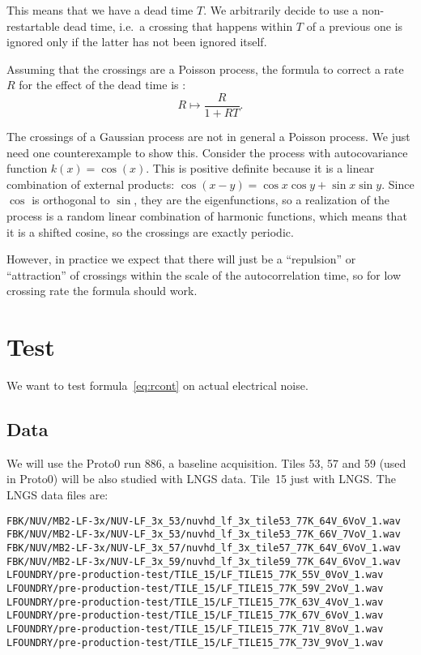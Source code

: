This means that we have a dead time $T$. We arbitrarily decide to use a
non-restartable dead time, i.e.\ a crossing that happens within $T$ of a
previous one is ignored only if the latter has not been ignored itself.

Assuming that the crossings are a Poisson process, the formula to correct a
rate $R$ for the effect of the dead time is \cite[120]{knoll2010}:
%
\begin{equation}
    R \mapsto \frac R {1 + RT}. \label{eq:deadrate}
\end{equation}

The crossings of a Gaussian process are not in general a Poisson process. We
just need one counterexample to show this. Consider the process with
autocovariance function $k(x)=\cos(x)$. This is positive definite because it is
a linear combination of external products: $\cos(x-y) = \cos x \cos y + \sin x
\sin y$. Since $\cos$ is orthogonal to $\sin$, they are the eigenfunctions, so
a realization of the process is a random linear combination of harmonic
functions, which means that it is a shifted cosine, so the crossings are
exactly periodic.

However, in practice we expect that there will just be a ``repulsion'' or
``attraction'' of crossings within the scale of the autocorrelation time, so
for low crossing rate the formula should work.

\section{Test}

We want to test formula~\eqref{eq:rcont} on actual electrical noise.

\subsection{Data}

We will use the Proto0 run 886, a baseline acquisition. Tiles 53, 57 and 59
(used in Proto0) will be also studied with LNGS data. Tile~15 just with LNGS.
The LNGS data files are:
%
\begin{verbatim}
FBK/NUV/MB2-LF-3x/NUV-LF_3x_53/nuvhd_lf_3x_tile53_77K_64V_6VoV_1.wav
FBK/NUV/MB2-LF-3x/NUV-LF_3x_53/nuvhd_lf_3x_tile53_77K_66V_7VoV_1.wav
FBK/NUV/MB2-LF-3x/NUV-LF_3x_57/nuvhd_lf_3x_tile57_77K_64V_6VoV_1.wav
FBK/NUV/MB2-LF-3x/NUV-LF_3x_59/nuvhd_lf_3x_tile59_77K_64V_6VoV_1.wav
LFOUNDRY/pre-production-test/TILE_15/LF_TILE15_77K_55V_0VoV_1.wav
LFOUNDRY/pre-production-test/TILE_15/LF_TILE15_77K_59V_2VoV_1.wav
LFOUNDRY/pre-production-test/TILE_15/LF_TILE15_77K_63V_4VoV_1.wav
LFOUNDRY/pre-production-test/TILE_15/LF_TILE15_77K_67V_6VoV_1.wav
LFOUNDRY/pre-production-test/TILE_15/LF_TILE15_77K_71V_8VoV_1.wav
LFOUNDRY/pre-production-test/TILE_15/LF_TILE15_77K_73V_9VoV_1.wav
\end{verbatim}

